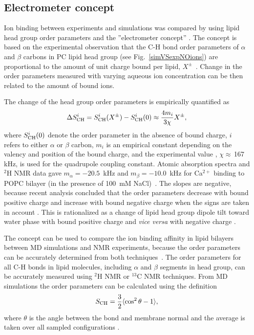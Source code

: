\documentclass[aip,jcp,twocolumn]{revtex4}
\begin{document}
\subsection{Electrometer concept} \label{section:electrometer}
Ion binding between experiments and simulations was compared by 
using lipid head group order parameters and the
''electrometer concept'' \cite{seelig87,catte16}.
The concept is based on the experimental observation that the C-H bond
order parameters of $\alpha$ and $\beta$ carbons in PC lipid head group
(see Fig.~\ref{simVSexpNOions}) are proportional to the amount 
of unit charge bound per lipid,  $X^\pm$~\cite{seelig87}.
Change in the order parameters measured with varying aqueous
ion concentration can be then related to the amount of bound ions.

The change of the head group order parameters is empirically quantified
as~\cite{seelig87,ferreira16}
\begin{equation}\label{OPchangeEQ}
  \Delta S_{\rm{CH}}^{i}= S_{\rm{CH}}^{i}(X^\pm)-S_{\rm{CH}}^{i}(0) \approx \frac{4m_i }{3\chi}X^\pm,
\end{equation}
where $S_{\rm{CH}}^{i}(0)$ denote the order parameter in the absence of bound charge,
$i$ refers to either $\alpha$ or $\beta$ carbon,
$m_i$ is an empirical constant depending on the valency and position of the bound charge,
and the experimental value \cite{seelig77,davis83}, $\chi \approx$\,167\,kHz, is used for the quadrupole coupling constant.
Atomic absorption spectra and $^2$H NMR data gave
$m_\alpha=-20.5$~kHz  and $m_\beta=-10.0$~kHz for Ca$^{2+}$ binding to POPC
bilayer (in the presence of 100~mM NaCl)~\cite{altenbach84,ollila16,catte16}.
The slopes are negative, because recent analysis concluded 
that the order parameters decrease with bound positive charge 
and increase with bound negative charge when the signs are taken 
in account \cite{ollila16,catte16}. This is rationalized as a change
of lipid head group dipole tilt toward water phase with bound positive
charge and {\it vice versa} with negative charge \cite{seelig87}. 

The concept can be used to compare the ion binding affinity in lipid 
bilayers between MD simulations and  NMR experiments, because the order
parameters can be accurately determined from both techniques~\cite{ollila16}.
The order parameters for all C-H bonds in lipid molecules, including
$\alpha$ and $\beta$ segments in head group, can be accurately measured
using $^2$H NMR or $^{13}$C NMR techniques. From MD simulations the
order parameters can be calculated using the definition
\begin{equation}\label{OP}
S_{\rm CH}=\frac{3}{2}\langle \cos^2\theta -1 \rangle,
\end{equation}
where $\theta$ is the angle between the bond and membrane
normal and the average is taken over all sampled configurations \cite{ollila16}.
\end{document}
